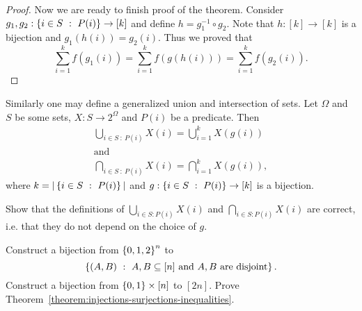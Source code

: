 \begin{proof}
  Now we are ready to finish proof of the theorem.
  Consider $g_1, g_2 : \set[P(i)]{i \in S} \to [k]$ and define
  $h = g_1^{-1} \circ g_2$. Note that $h : [k] \to [k]$ is a bijection and
  $g_1(h(i)) = g_2(i)$. Thus we proved that
  \[
    \sum_{i = 1}^k f(g_1(i)) = \sum_{i = 1}^k f(g(h(i))) =
    \sum_{i = 1}^k f(g_2(i)).
  \]
\end{proof}

Similarly one may define a generalized union and intersection of sets.
Let $\Omega$ and $S$ be some sets, $X : S \to 2^\Omega$ and $P(i)$ be a
predicate. Then
\begin{gather*}
  \bigcup_{i \in S ~:~ P(i)} X(i) = \bigcup_{i = 1}^k X(g(i)) \\
  \text{and}\\
  \bigcap_{i \in S ~:~ P(i)} X(i) = \bigcap_{i = 1}^k X(g(i)),
\end{gather*}
where $k = |\set[P(i)]{i \in S}|$ and $g : \set[P(i)]{i \in S} \to [k]$ is a
bijection.

\begin{exercise}
  Show that the definitions of $\bigcup_{i \in S : P(i)} X(i)$ and
  $\bigcap_{i \in S : P(i)} X(i)$ are correct,
  i.e. that they do not depend on the choice of $g$.
\end{exercise}


\begin{exercises}
  \exercise Construct a bijection from $\set{0, 1, 2}^n$ to
    \[
      \set[{A, B \subseteq [n] \text{ and } A, B \text{ are disjoint}}]{(A, B)}.
    \]
  \exercise Construct a bijection from $\set{0, 1} \times [n]$ to $[2n]$.
  \exercise Prove Theorem~\ref{theorem:injections-surjections-inequalities}.
\end{exercises}
